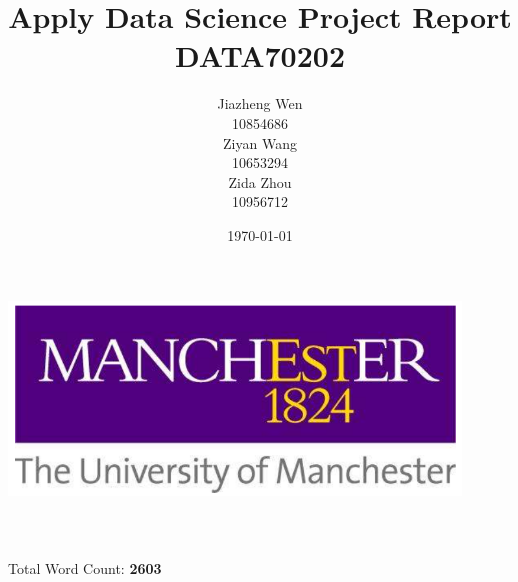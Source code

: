 \title{\Huge Apply Data Science Project Report \\[1cm]
        \bf\LARGE DATA70202 }
\author{\Large Jiazheng Wen\\ 10854686 \\[10pt]
                Ziyan Wang \\ 10653294 \\[10pt]
                Zida Zhou \\ 10956712 \\}
\date{\Large \today}

\makeatletter
    \begin{titlepage}
        \begin{center}
	        {\includegraphics[width=12cm]{Settings/TitlePicture.png}}
	   {\ \\}
        \vbox{}\vspace{3cm}
            {\@title }\\[1cm] 
            {\@author}\\[15pt]
            {\@date}\\[20pt]
            {\Large Total Word Count: \bf 2603 \\ \ \\}
        \end{center}
    \end{titlepage}
\makeatother